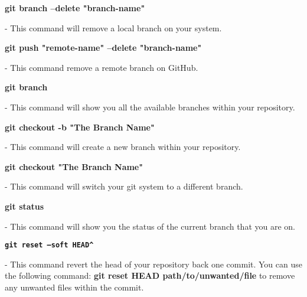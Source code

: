 \documentclass[11pt, a4papper]{article}
\begin{document}
\begin{adjustwidth}{3cm}{}

\noindent \textbf{git branch --delete "branch-name"}
\begin{adjustwidth}{1cm}{} 
- This command will remove a local branch on your system.
\end{adjustwidth}

\noindent \textbf{git push "remote-name" --delete "branch-name"}
\begin{adjustwidth}{1cm}{} 
- This command remove a remote branch on GitHub.
\end{adjustwidth}

\noindent \textbf{git branch}
\begin{adjustwidth}{1cm}{} 
- This command will show you all the available branches within your repository. 
\end{adjustwidth}

\noindent \textbf{git checkout -b "The Branch Name"}
\begin{adjustwidth}{1cm}{} 
- This command will create a new branch within your repository.
\end{adjustwidth}

\noindent \textbf{git checkout "The Branch Name"}
\begin{adjustwidth}{1cm}{} 
- This command will switch your git system to a different branch.
\end{adjustwidth}

\noindent \textbf{git status}
\begin{adjustwidth}{1cm}{} 
- This command will show you the status of the current branch that you are on.
\end{adjustwidth}

\noindent \texttt{\textbf{git reset --soft HEAD\^ }}
\begin{adjustwidth}{1cm}{} 
- This command revert the head of your repository back one commit. You can use the following command: \textbf{git reset HEAD path/to/unwanted/file} to remove any unwanted files within the commit.
\end{adjustwidth}

\end{adjustwidth}
\end{document}
